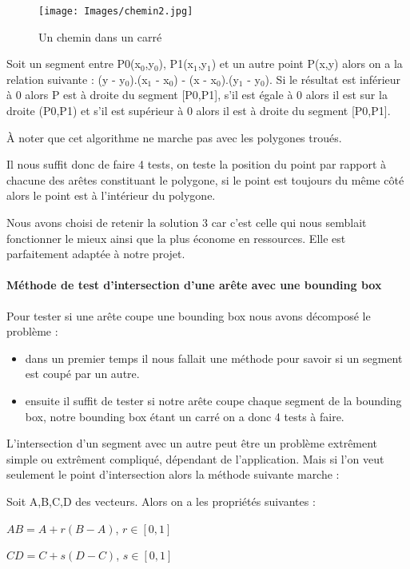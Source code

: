 \documentclass[a4paper,12pt]{report}
\begin{document}
\begin{figure}[h]
\centering
\texttt{[image: Images/chemin2.jpg]}
\caption{Un chemin dans un carré}
\end{figure}
\vspace{0.5cm}

Soit un segment entre P0(x$_{0}$,y$_{0}$), P1(x$_{1}$,y$_{1}$) et un autre point P(x,y) alors on a la relation suivante : (y - y$_{0}$).(x$_{1}$ - x$_{0}$) - (x - x$_{0}$).(y$_{1}$ - y$_{0}$).
Si le résultat est inférieur à 0 alors P est à droite du segment [P0,P1], s'il est égale à 0 alors il est sur la droite (P0,P1) et s'il est supérieur à 0 alors il est à droite du segment [P0,P1].

À noter que cet algorithme ne marche pas avec les polygones troués. 

Il nous suffit donc de faire 4 tests, on teste la position du point par rapport à chacune des arêtes constituant le polygone, si le point est toujours du même côté alors le point est à l'intérieur du polygone.

Nous avons choisi de retenir la solution 3 car c'est celle qui nous semblait fonctionner le mieux ainsi que la plus économe en ressources. Elle est parfaitement adaptée à notre projet.

\paragraph{Méthode de test d'intersection d'une arête avec une bounding box }

Pour tester si une arête coupe une bounding box nous avons décomposé le problème :
\begin{itemize}
 \item dans un premier temps il nous fallait une méthode pour savoir si un segment est coupé par un autre.
 \item ensuite il suffit de tester si notre arête coupe chaque segment de la bounding box, notre bounding box étant un carré on a donc 4 tests à faire.
\end{itemize}

L'intersection d'un segment avec un autre peut être un problème extrêment simple ou extrêment compliqué, dépendant de l'application. 
Mais si l'on veut seulement le point d'intersection alors la méthode suivante marche :

Soit A,B,C,D des vecteurs. Alors on a les propriétés suivantes :

$AB=A+r(B-A)$, $r \in [0,1]$


$CD=C+s(D-C)$, $s \in [0,1]$
\end{document}
